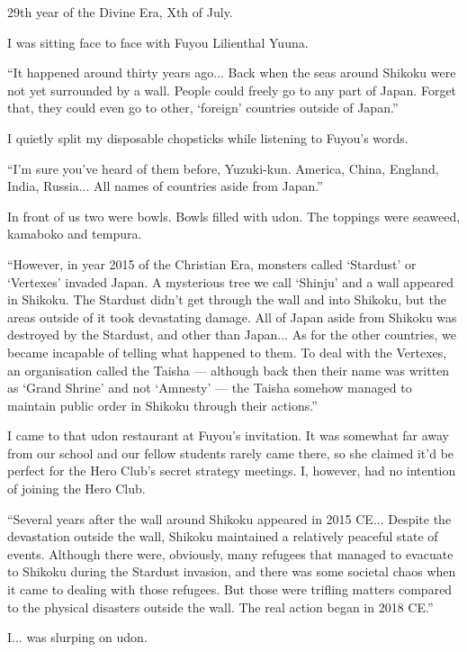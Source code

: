 

29th year of the Divine Era, Xth of July.

I was sitting face to face with Fuyou Lilienthal Yuuna.

``It happened around thirty years ago... Back when the seas around Shikoku were not yet surrounded by a wall. People could freely go to any part of Japan. Forget that, they could even go to other, `foreign' countries outside of Japan.''

I quietly split my disposable chopsticks while listening to Fuyou's words.

``I'm sure you've heard of them before, Yuzuki-kun. America, China, England, India, Russia... All names of countries aside from Japan.''

In front of us two were bowls. Bowls filled with udon. The toppings were seaweed, kamaboko and tempura.

``However, in year 2015 of the Christian Era, monsters called `Stardust' or `Vertexes' invaded Japan. A mysterious tree we call `Shinju' and a wall appeared in Shikoku. The Stardust didn't get through the wall and into Shikoku, but the areas outside of it took devastating damage. All of Japan aside from Shikoku was destroyed by the Stardust, and other than Japan... As for the other countries, we became incapable of telling what happened to them. To deal with the Vertexes, an organisation called the Taisha --- although back then their name was written as `Grand Shrine' and not `Amnesty' --- the Taisha somehow managed to maintain public order in Shikoku through their actions.''

I came to that udon restaurant at Fuyou's invitation. It was somewhat far away from our school and our fellow students rarely came there, so she claimed it'd be perfect for the Hero Club's secret strategy meetings. I, however, had no intention of joining the Hero Club.

``Several years after the wall around Shikoku appeared in 2015 CE... Despite the devastation outside the wall, Shikoku maintained a relatively peaceful state of events. Although there were, obviously, many refugees that managed to evacuate to Shikoku during the Stardust invasion, and there was some societal chaos when it came to dealing with those refugees. But those were trifling matters compared to the physical disasters outside the wall. The real action began in 2018 CE.''

I... was slurping on udon.

